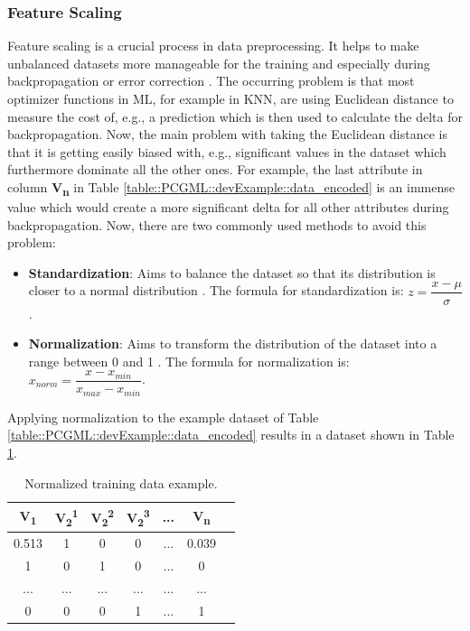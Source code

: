 \documentclass[MGS,Master,english]{twbook}%
\begin{document}
\subsubsection{Feature Scaling}\label{chapter::ml::feature_scaling} %
Feature scaling is a crucial process in data preprocessing. It helps to make unbalanced datasets more manageable for the training and especially during backpropagation or error correction \cite{ml::book::developer}. The occurring problem is that most optimizer functions in \ac{ML}, for example in \ac{KNN}, are using Euclidean distance to measure the cost of, e.g., a prediction which is then used to calculate the delta for backpropagation. Now, the main problem with taking the Euclidean distance is that it is getting easily biased with, e.g., significant values in the dataset which furthermore dominate all the other ones. For example, the last attribute in column \textbf{V\textsubscript{n}} in Table \ref{table::PCGML::devExample::data_encoded} is an immense value which would create a more significant delta for all other attributes during backpropagation. Now, there are two commonly used methods to avoid this problem:
\begin{itemize}
	\item \textbf{Standardization}: Aims to balance the dataset so that its distribution is closer to a normal distribution \cite{ml::book::developer}. The formula for standardization is: $z={\dfrac{x - \mu}{\sigma}}$.
	\item \textbf{Normalization}: Aims to transform the distribution of the dataset into a range between 0 and 1 \cite{ml::book::developer}. The formula for normalization is: $x_{norm}={\dfrac{x - x_{min}}{x_{max}-x_{min}}}$.
\end{itemize}
Applying normalization to the example dataset of Table \ref{table::PCGML::devExample::data_encoded} results in a dataset shown in Table \ref{table::PCGML::devExample::data_normalized}.
\begin{table}[!ht]
	\centering
	\begin{tabular}{|c|c|c|c|c|c|c|}
		\hline
		\textbf{V\textsubscript{1}} & \textbf{V\textsubscript{2}\textsuperscript{1}}& \textbf{V\textsubscript{2}\textsuperscript{2}}& \textbf{V\textsubscript{2}\textsuperscript{3}} & \textbf{...} & \textbf{V\textsubscript{n}} \\ \hline\hline
		0.513      & 1   & 0   & 0       & ...          & 0.039         \\ \hline
		1           & 0   & 1   & 0       & ...          & 0          \\ \hline
		...         & ... & ... & ...     & ...          & ...         \\ \hline
		0      & 0   & 0   & 1       & ...          & 1         \\ \hline
	\end{tabular}
	\caption{Normalized training data example.}
	\label{table::PCGML::devExample::data_normalized}
\end{table}
\end{document}
